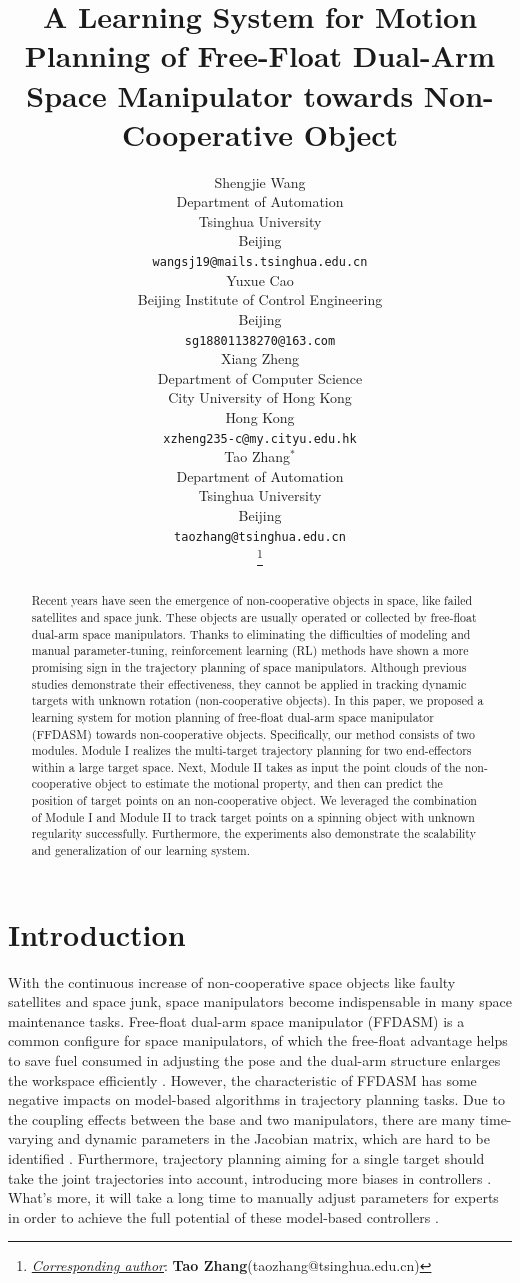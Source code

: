 \documentclass{article}
\title{A Learning System for Motion Planning of Free-Float Dual-Arm Space Manipulator
towards Non-Cooperative Object
}
\author{
  Shengjie Wang \\
  Department of Automation \\
  Tsinghua University \\
  Beijing\\
  \texttt{wangsj19@mails.tsinghua.edu.cn} \\
   \And
  Yuxue Cao \\
  Beijing Institute of Control Engineering \\
  Beijing\\
  \texttt{sg18801138270@163.com} \\
   \And
  Xiang Zheng \\
  Department of Computer Science \\
  City University of Hong Kong \\
  Hong Kong\\
  \texttt{xzheng235-c@my.cityu.edu.hk} \\
   \And
  Tao Zhang$^{*}$ \\
  Department of Automation \\
  Tsinghua University \\
  Beijing\\
  \texttt{taozhang@tsinghua.edu.cn} \\
\thanks{\textit{\underline{Corresponding author}}: 
\textbf{Tao Zhang}(taozhang@tsinghua.edu.cn)}
}
\begin{document}
\maketitle


\begin{abstract}
Recent years have seen the emergence of non-cooperative objects in space, like failed satellites and space junk. These objects are usually operated or collected by free-float dual-arm space manipulators. Thanks to eliminating the difficulties of modeling and manual parameter-tuning, reinforcement learning (RL) methods have shown a more promising sign in the trajectory planning of space manipulators. Although previous studies demonstrate their effectiveness, they cannot be applied in tracking dynamic targets with unknown rotation (non-cooperative objects). In this paper, we proposed a learning system for motion planning of free-float dual-arm space manipulator (FFDASM) towards non-cooperative objects. Specifically, our method consists of two modules. Module I realizes the multi-target trajectory planning for two end-effectors within a large target space. Next, Module II takes as input the point clouds of the non-cooperative object to estimate the motional property, and then can predict the position of target points on an non-cooperative object. We leveraged the combination of Module I and Module II to track target points on a spinning object with unknown regularity successfully. Furthermore, the experiments also demonstrate the scalability and generalization of our learning system. 




\end{abstract}




\section{Introduction}

With the continuous increase of non-cooperative space objects like faulty satellites and space junk, space manipulators become indispensable in many space maintenance tasks.  Free-float dual-arm space manipulator (FFDASM) is a common configure for space manipulators, of which the free-float advantage helps to save fuel consumed in adjusting the pose and the dual-arm structure enlarges the workspace efficiently \cite{oda1996ets}. However, the characteristic of FFDASM has some negative impacts on model-based algorithms in trajectory planning tasks. Due to the coupling effects between the base and two manipulators, there are many time-varying and dynamic parameters in the Jacobian matrix,  which are hard to be identified  \cite{yoshida2001zero,wang2009passivity}. Furthermore, trajectory planning aiming for a single target should take the joint trajectories into account, introducing more biases in controllers \cite{liu2016trajectory,yoshida2006capture}. What's more, it will take a long time to manually adjust parameters for experts in order to achieve the full potential of these model-based controllers  \cite{yan2021trajectory,huang2007adaptive}. 
\end{document}
